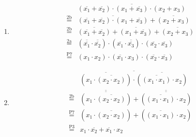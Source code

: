 \documentclass[DIN, pagenumber=false, fontsize=11pt, parskip=half]{scrartcl}
\begin{document}
    \subsection{}
    \begin{enumerate}
        \item
            \begin{eqnarray*}
                &&\overline{(\overline{x_1} + \overline{x_2}) \cdot (x_1 + \overline{x_3}) \cdot (x_2 + x_3)} \\
                &\stackrel{\text{2b}}{=}&  \overline{(\overline{x_1} + \overline{x_2}) \cdot (x_1 + \overline{x_3})} + \overline{(x_2 + x_3)}  \\
                &\stackrel{\text{2b}}{=}&  \overline{(\overline{x_1} + \overline{x_2})} + \overline{(x_1 + \overline{x_3})} + \overline{(x_2 + x_3)}  \\
                &\stackrel{\text{2a}}{=}&  (\overline{\overline{x_1}} \cdot \overline{\overline{x_2}}) \cdot 
                                        (\overline{x_1} \cdot  \overline{\overline{x_3}}) \cdot (\overline{x_2} \cdot \overline{x_3}) \\
                &\stackrel{\text{P7}}{=}& (x_1 \cdot x_2) \cdot (\overline{x_1} \cdot x_3) \cdot (\overline{x_2} \cdot \overline{x_3})
            \end{eqnarray*}
        \item
            \begin{eqnarray*}
                &&\overline{\overline{(x_1 \cdot \overline{(x_2 \cdot x_2)})} \cdot \overline{(\overline{(x_1 \cdot x_1)}\cdot x_2 )}} \\
                &\stackrel{\text{2b}}{=}& \overline{\overline{(x_1 \cdot \overline{(x_2 \cdot x_2)})}} + \overline{\overline{(\overline{(x_1 \cdot x_1)} \cdot x_2)}} \\
                &\stackrel{\text{P7}}{=}& (x_1 \cdot \overline{(x_2 \cdot x_2)}) + (\overline{(x_1 \cdot x_1)} \cdot x_2)\\
                &\stackrel{\text{P3}}{=}& x_1 \cdot \overline{x_2} + \overline{x_1} \cdot x_2\\
            \end{eqnarray*}
    \end{enumerate}
\end{document}
